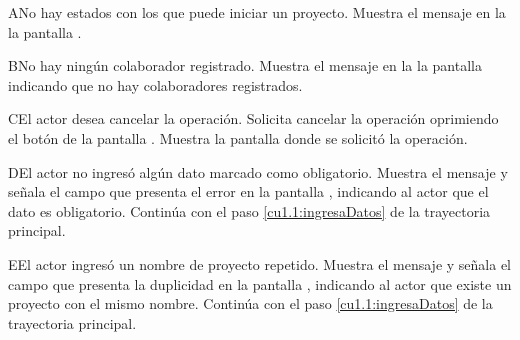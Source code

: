  \begin{UCtrayectoriaA}{A}{No hay estados con los que puede iniciar un proyecto.}
    \UCpaso[\UCsist] Muestra el mensaje  en la la pantalla .
 \end{UCtrayectoriaA} 
 \begin{UCtrayectoriaA}{B}{No hay ningún colaborador registrado.}
    \UCpaso[\UCsist] Muestra el mensaje  en la la pantalla  indicando que no hay colaboradores registrados.
 \end{UCtrayectoriaA} 
 \begin{UCtrayectoriaA}{C}{El actor desea cancelar la operación.}
    \UCpaso[\UCactor] Solicita cancelar la operación oprimiendo el botón  de la pantalla .
    \UCpaso[\UCsist] Muestra la pantalla donde se solicitó la operación.
 \end{UCtrayectoriaA} 
 \begin{UCtrayectoriaA}{D}{El actor no ingresó algún dato marcado como obligatorio.}
    \UCpaso[\UCsist] Muestra el mensaje  y señala el campo que presenta el error en la pantalla 
	    , indicando al actor que el dato es obligatorio.
    \UCpaso[] Continúa con el paso \ref{cu1.1:ingresaDatos} de la trayectoria principal.
 \end{UCtrayectoriaA}
 \begin{UCtrayectoriaA}{E}{El actor ingresó un nombre de proyecto repetido.}
    \UCpaso[\UCsist] Muestra el mensaje  y señala el campo que presenta la duplicidad en la pantalla 
	    , indicando al actor que existe un proyecto con el mismo nombre.
    \UCpaso[] Continúa con el paso \ref{cu1.1:ingresaDatos} de la trayectoria principal.
 \end{UCtrayectoriaA}
